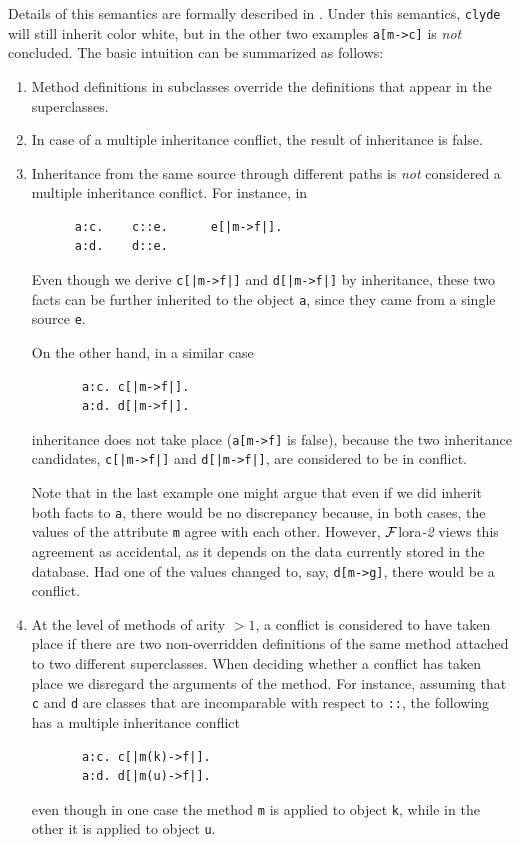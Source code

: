 \documentclass[11pt]{article}
\newcommand{\FLORA}{{\mbox{\sc ${\cal F}${lora}\rm\emph{-2}}}\xspace}
\newcommand{\FLSYSTEM}{\FLORA}
\begin{document}
Details of this semantics are formally described in
\cite{inheritance-odbase-02}.  Under this semantics, {\tt clyde} will still
inherit color white, but in the other two examples {\tt a[m->c]} is
\emph{not} concluded.  The basic intuition can be summarized as follows:
\begin{enumerate}
\item  Method definitions in subclasses override the definitions that
  appear in the superclasses.
\item In case of a multiple inheritance conflict, the result of inheritance
  is false.
\item  Inheritance from the same source through different paths is
  \emph{not} considered a multiple inheritance conflict. For instance, in
  \begin{verbatim}
      a:c.    c::e.      e[|m->f|].    
      a:d.    d::e.
  \end{verbatim}
  Even though we derive {\tt c[|m->f|]} and {\tt d[|m->f|]} by inheritance,
  these two facts can be further inherited to the object {\tt a}, since
  they came from a single source {\tt e}.

  On the other hand, in a similar case
  \begin{verbatim}
       a:c. c[|m->f|].    
       a:d. d[|m->f|].     
  \end{verbatim}
  inheritance does not take place ({\tt a[m->f]} is false),
  because the two inheritance candidates, {\tt c[|m->f|]} and
  {\tt d[|m->f|]}, are considered to be in conflict.

  Note that in the last example one might argue that even if we did inherit
  both facts to {\tt a}, there would be no discrepancy because, in both
  cases, the values of the attribute {\tt m} agree with each other.
  However, \FLSYSTEM views this agreement as accidental, as it depends on the
  data currently stored in the database. Had one of the values changed to, say,
  {\tt d[m->g]}, there would be a conflict.
  
\item At the level of methods of arity $>1$, a conflict is considered to have
  taken place if there are two non-overridden definitions of the same method
  attached to two different superclasses. When deciding whether a conflict
  has taken place we disregard the arguments of the method. For instance,
  assuming that \texttt{c} and \texttt{d} are classes that are
  incomparable with
  respect to \texttt{::}, the following has a multiple inheritance conflict 
\begin{verbatim}
       a:c. c[|m(k)->f|].    
       a:d. d[|m(u)->f|].     
\end{verbatim}
  even though in one case
  the method {\tt m} is applied to object {\tt k}, while in the other it is
  applied to object {\tt u}. 


\end{enumerate}
\end{document}
